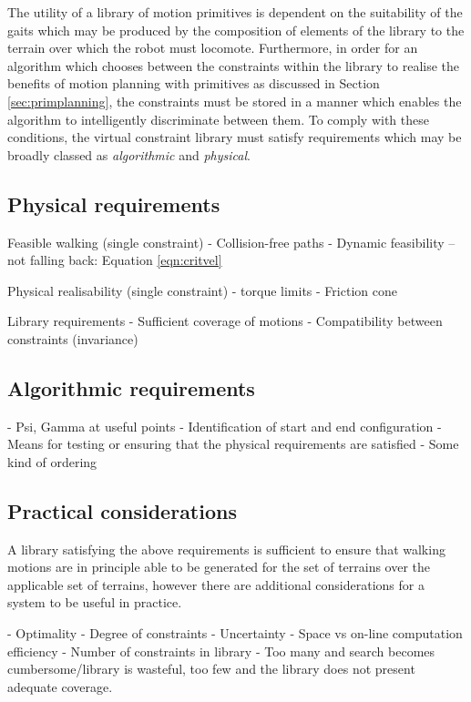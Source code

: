 The utility of a library of motion primitives is dependent on the suitability of the gaits which may be produced by the composition of elements of the library to the terrain over which the robot must locomote. Furthermore, in order for an algorithm which chooses between the constraints within the library to realise the benefits of motion planning with primitives as discussed in Section \ref{sec:primplanning}, the constraints must be stored in a manner which enables the algorithm to intelligently discriminate between them. To comply with these conditions, the virtual constraint library must satisfy requirements which may be broadly classed as \textit{algorithmic} and \textit{physical}.

\subsection{Physical requirements}
Feasible walking (single constraint)
- Collision-free paths
- Dynamic feasibility -- not falling back: Equation \ref{eqn:critvel}

Physical realisability (single constraint)
- torque limits
- Friction cone

Library requirements
- Sufficient coverage of motions
- Compatibility between constraints (invariance)

\subsection{Algorithmic requirements}
- Psi, Gamma at useful points
- Identification of start and end configuration
- Means for testing or ensuring that the physical requirements are satisfied
- Some kind of ordering

\subsection{Practical considerations}
A library satisfying the above requirements is sufficient to ensure that walking motions are in principle able to be generated for the set of terrains over the applicable set of terrains, however there are additional considerations for a system to be useful in practice.

- Optimality
- Degree of constraints
- Uncertainty
- Space vs on-line computation efficiency
- Number of constraints in library - Too many and search becomes cumbersome/library is wasteful, too few and the library does not present adequate coverage.